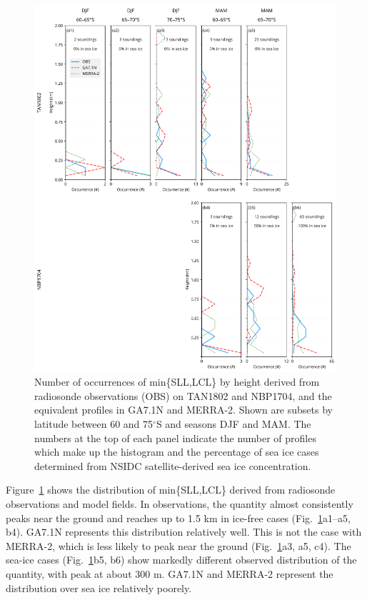 \begin{figure}[p]
\centering
\centerline{\includegraphics[width=1.12\textwidth]{chapter2/fig/sst_lifting_level_panel_rev3.pdf}}
\caption[Number of occurrences of min\{SLL,LCL\} by height]{
Number of occurrences of min\{SLL,LCL\} by height
derived from radiosonde observations (OBS) on
TAN1802 and NBP1704, and the equivalent profiles in GA7.1N and MERRA-2.  Shown
are subsets by latitude between 60 and 75$^\circ$S and seasons DJF and MAM.
The numbers at the top of each panel indicate the number of profiles which make
up the histogram and the percentage of sea ice cases determined from NSIDC
satellite-derived sea ice concentration.
}
\label{fig:2:sll-distribution}
\end{figure}

Figure~\ref{fig:2:sll-distribution} shows the distribution of min\{SLL,LCL\}
derived from radiosonde observations and model fields. In observations, the
quantity almost consistently peaks near the ground and reaches up to 1.5 km in
ice-free cases (Fig.~\ref{fig:2:sll-distribution}a1--a5, b4). GA7.1N represents
this distribution relatively well. This is not the case with MERRA-2, which is
less likely to peak near the ground (Fig.~\ref{fig:2:sll-distribution}a3, a5, c4).
The sea-ice cases (Fig.~\ref{fig:2:sll-distribution}b5, b6)
show markedly different observed distribution of the quantity, with peak at
about 300 m.  GA7.1N and MERRA-2 represent the distribution over sea ice
relatively poorely.


